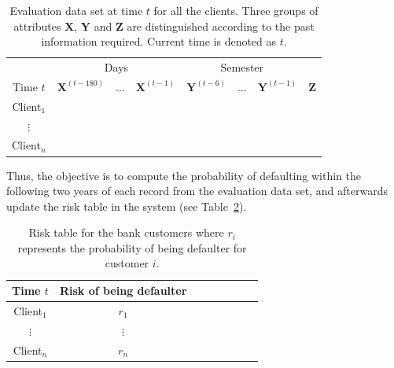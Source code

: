 \documentclass{article}
\theoremstyle{theorem}
\theoremstyle{definition}
\newcommand{\X}{\mathbf{X}}
\newcommand{\Y}{\mathbf{Y}}
\newcommand{\Z}{\mathbf{Z}}
\begin{document}
{\begin{itemize}


\begin{table}[ht!]
\centering
\begin{tabular}{c|ccc|ccc|c}
	&\multicolumn{3}{c|}{Days} & \multicolumn{3}{c|}{Semester} \\
     Time $t$              & $\X^{(t-180)}$ & $\ldots$ & $\X^{(t-1)} $ & $\Y^{(t-6)}$  & $\ldots$ & $\Y^{(t-1)} $ & $\Z$  \\  
\hline
Client$_1$  &                                                  &              &                     &                               &                     &        \\ 
$\vdots$      &                                                 &               &                     &                                &                     &      \\ 
Client$_n$  &                                                &               &                     &                                &                     &     \\ 
\end{tabular}
\caption{Evaluation data set at time $t$ for all the clients. Three groups of attributes $\X$, $\Y$ and $\Z$ are distinguished according to the past information required. Current time is denoted as $t$.}
\label{tab:EvaluationDataset} 
\end{table}

Thus, the objective is to compute the probability of defaulting within the following two years of each record from the evaluation data set, and afterwards update the risk table in the system (see Table~\ref{tab:riskTable}).

\begin{table}[ht!]
\centering
\begin{tabular}{c|ccc|ccc|c}
     Time $t$  & Risk of being defaulter \\  
\hline
Client$_1$  &    $r_1$  \\ 
$\vdots$      &   $\vdots$   \\ 
Client$_n$  &   $r_n$  \\ 
\end{tabular} 
\caption{Risk table for the bank customers where $r_i$ represents the probability of being defaulter for customer $i$.}
\label{tab:riskTable}
\end{table}


\end{itemize}}
\end{document}
